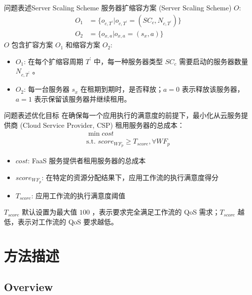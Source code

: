 \documentclass[aspectratio=169]{beamer}
\begin{document}
\begin{frame}{问题表述}{Server Scaling Scheme}
  服务器扩缩容方案 (Server Scaling Scheme) $O$:
  \begin{align*}
    O_1 &= \{o_{c,T^\prime}|o_{c,T^\prime} = (SC_c,N_{c,T^\prime})\} \\
    O_2 &= \{o_{x,a}|o_{x,a} = (s_x,a)\}
  \end{align*}
  $O$ 包含扩容方案 $O_1$ 和缩容方案 $O_2$:
  \begin{itemize}
    \item $O_1$: 在每个扩缩容周期 $T^\prime$ 中，每一种服务器类型 $SC_c$ 需要启动的服务器数量 $N_{c,T^\prime}$ 。
    \item $O_2$: 每一台服务器 $s_x$ 在租期到期时，是否释放；$a=0$ 表示释放该服务器，$a=1$ 表示保留该服务器并继续租用。
  \end{itemize}
\end{frame}

\begin{frame}{问题表述}{优化目标}\label{label:objective}
  在确保每一个应用执行的满意度的前提下，最小化从云服务提供商 (Cloud Service Provider, CSP) 租用服务器的总成本：
  \begin{gather*}
    \min cost \\
    \text{s.t. } score_{WF_p} \geqslant T_{score}, \forall WF_p
  \end{gather*}
  \begin{itemize}
    \item $cost$: FaaS 服务提供者租用服务器的总成本
    \item $score_{WF_p}$: 在特定的资源分配结果下，应用工作流的执行满意度得分
    \item $T_{score}$: 应用工作流的执行满意度阈值
  \end{itemize}

  $T_{score}$ 默认设置为最大值 $100$ ，表示要求完全满足工作流的 QoS 需求；$T_{score}$ 越低，表示对工作流的 QoS 要求越低。

  \hfill\hyperlink{label:bet-and-bec}{}
\end{frame}

\section{方法描述}

\subsection{Overview}
\end{document}
